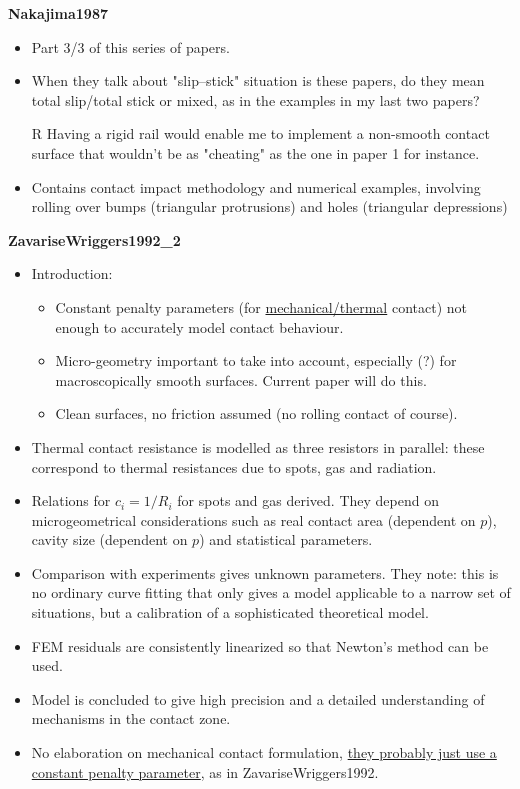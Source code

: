 \documentclass{article}
\begin{document}
\textbf{Nakajima1987}
\begin{itemize}
\item Part 3/3 of this series of papers.
\item When they talk about "slip--stick" situation is these papers, do they mean total slip/total stick or mixed, as in the examples in my last two papers?
\item[R] Having a rigid rail would enable me to implement a non-smooth contact surface that wouldn't be as "cheating" as the one in paper 1 for instance.
\item Contains contact impact methodology and numerical examples, involving rolling over bumps (triangular protrusions) and holes (triangular depressions)
\end{itemize}

\textbf{ZavariseWriggers1992\_2}
\begin{itemize}
\item Introduction:
\begin{itemize}
\item Constant penalty parameters (for \underline{mechanical/thermal} contact) not enough to accurately model contact behaviour.
\item Micro-geometry important to take into account, especially (?) for macroscopically smooth surfaces. Current paper will do this.
\item Clean surfaces, no friction assumed (no rolling contact of course).
\end{itemize}
\item Thermal contact resistance is modelled as three resistors in parallel: these correspond to thermal resistances due to spots, gas and radiation.
\item Relations for $c_i = 1/R_i$ for spots and gas derived. They depend on microgeometrical considerations such as real contact area (dependent on $p$), cavity size (dependent on $p$) and statistical parameters.
\item Comparison with experiments gives unknown parameters. They note: this is no ordinary curve fitting that only gives a model applicable to a narrow set of situations, but a calibration of a sophisticated theoretical model.
\item FEM residuals are consistently linearized so that Newton's method can be used.
\item Model is concluded to give high precision and a detailed understanding of mechanisms in the contact zone.
\item No elaboration on mechanical contact formulation, \underline{they probably just use a constant penalty parameter}, as in ZavariseWriggers1992.
\end{itemize}
\end{document}
